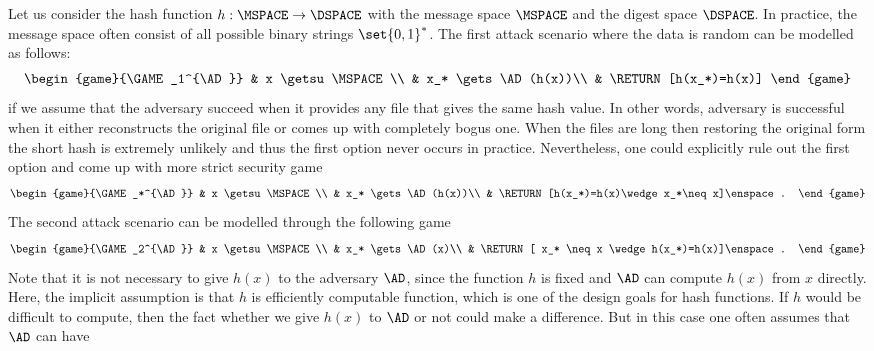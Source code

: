 \documentclass{crypto-exercise}
\begin{document}
\begin{solution}
  Let us consider the hash function $h: \MSPACE \rightarrow \DSPACE$
  with the message space $\MSPACE$ and the digest space $\DSPACE$. In
  practice, the message space often consist of all possible binary
  strings $\set{0,1}^*$. The first attack scenario where the data is
  random can be modelled as follows:
  \begin{align*}
    \begin{game}{\GAME_1^{\AD}}
      & x \getsu \MSPACE \\
      & x_* \gets \AD(h(x))\\
      & \RETURN [h(x_*)=h(x)]
    \end{game}
  \end{align*}
  if we assume that the adversary succeed when it provides any file
  that gives the same hash value. In other words, adversary is
  successful when it either reconstructs the original file or comes up
  with completely bogus one. When the files are long then restoring
  the original form the short hash is extremely unlikely and thus the
  first option never occurs in practice. Nevertheless, one could
  explicitly rule out the first option and come up with more strict
  security game
  \begin{align*}
    \begin{game}{\GAME_*^{\AD}}
      & x \getsu \MSPACE \\
      & x_* \gets \AD(h(x))\\
      & \RETURN [h(x_*)=h(x)\wedge x_*\neq x]\enspace.
    \end{game}
  \end{align*}
  The second attack scenario can be modelled through the following game
  \begin{align*}
    \begin{game}{\GAME_2^{\AD}}
      & x \getsu \MSPACE\\
      & x_* \gets  \AD(x)\\
      & \RETURN [ x_* \neq x \wedge h(x_*)=h(x)]\enspace.
    \end{game}
  \end{align*}
  Note that it is not necessary to give $h(x)$ to the adversary $\AD$,
  since the function $h$ is fixed and $\AD$ can compute $h(x)$ from
  $x$ directly. Here, the implicit assumption is that $h$ is
  efficiently computable function, which is one of the design goals
  for hash functions. If $h$ would be difficult to compute, then the
  fact whether we give $h(x)$ to $\AD$ or not could make a
  difference. But in this case one often assumes that $\AD$ can have

\end{solution}
\end{document}
